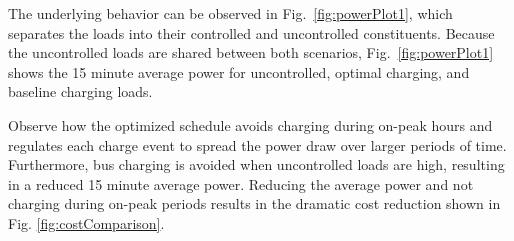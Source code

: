 \par The underlying behavior can be observed in Fig.~\ref{fig:powerPlot1}, which separates the loads into their controlled and uncontrolled constituents. Because the uncontrolled loads are shared between both scenarios, Fig.~\ref{fig:powerPlot1} shows the 15 minute average power for uncontrolled, optimal charging, and baseline charging loads. 
\par Observe how the optimized schedule avoids charging during on-peak hours and regulates each charge event to spread the power draw over larger periods of time. Furthermore, bus charging is avoided when uncontrolled loads are high, resulting in a reduced 15 minute average power.  Reducing the average power and not charging during on-peak periods results in the dramatic cost reduction shown in Fig. \ref{fig:costComparison}.

\begin{figure*}
	\centering
	\caption{15-Minute average power for one day.}
	\label{fig:totalPower1}
\end{figure*} 
\begin{figure*}
	\centering
	\caption{Comparison between uncontrolled and bus loads.}
	\label{fig:powerPlot1}
\end{figure*}

